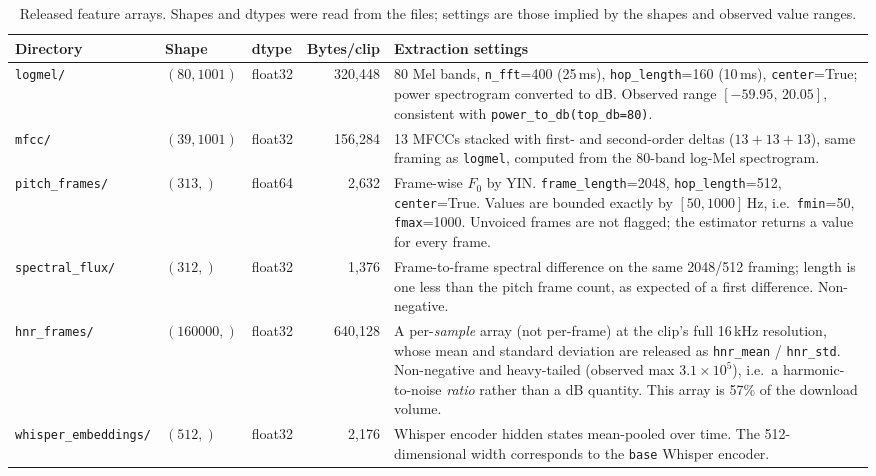 \documentclass[conference]{IEEEtran}
\begin{document}
\begin{table}[t]
\centering
\caption{Released feature arrays. Shapes and dtypes were read from the files; settings
are those implied by the shapes and observed value ranges.}
\label{tab:s6}
\footnotesize
\setlength{\tabcolsep}{4pt}
\begin{tabular}{lllrp{7.4cm}}
\toprule
\textbf{Directory} & \textbf{Shape} & \textbf{dtype} & \textbf{Bytes/clip} & \textbf{Extraction settings} \\
\midrule
\texttt{logmel/} & $(80,1001)$ & float32 & 320{,}448 &
80 Mel bands, \texttt{n\_fft}=400 (25\,ms), \texttt{hop\_length}=160 (10\,ms),
\texttt{center}=True; power spectrogram converted to dB. Observed range
$[-59.95,\,20.05]$, consistent with \texttt{power\_to\_db(top\_db=80)}. \\
\texttt{mfcc/} & $(39,1001)$ & float32 & 156{,}284 &
13 MFCCs stacked with first- and second-order deltas ($13+13+13$), same framing as
\texttt{logmel}, computed from the 80-band log-Mel spectrogram. \\
\texttt{pitch\_frames/} & $(313,)$ & float64 & 2{,}632 &
Frame-wise $F_0$ by YIN. \texttt{frame\_length}=2048, \texttt{hop\_length}=512,
\texttt{center}=True. Values are bounded exactly by $[50,1000]$\,Hz, i.e.\
\texttt{fmin}=50, \texttt{fmax}=1000. Unvoiced frames are not flagged; the estimator
returns a value for every frame. \\
\texttt{spectral\_flux/} & $(312,)$ & float32 & 1{,}376 &
Frame-to-frame spectral difference on the same 2048/512 framing; length is one less than
the pitch frame count, as expected of a first difference. Non-negative. \\
\texttt{hnr\_frames/} & $(160000,)$ & float32 & 640{,}128 &
A per-\emph{sample} array (not per-frame) at the clip's full 16\,kHz resolution, whose
mean and standard deviation are released as \texttt{hnr\_mean} / \texttt{hnr\_std}.
Non-negative and heavy-tailed (observed max $3.1\times10^{5}$), i.e.\ a harmonic-to-noise
\emph{ratio} rather than a dB quantity. This array is 57\% of the download volume. \\
\texttt{whisper\_embeddings/} & $(512,)$ & float32 & 2{,}176 &
Whisper encoder hidden states mean-pooled over time. The 512-dimensional width
corresponds to the \texttt{base} Whisper encoder. \\
\bottomrule
\end{tabular}
\end{table}
\end{document}
